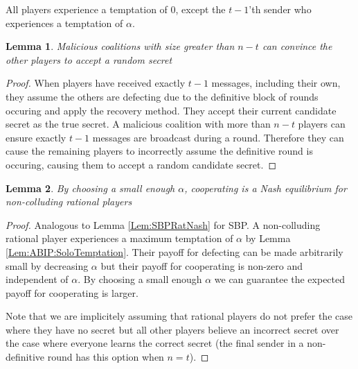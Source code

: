 \documentclass{dalcsthesis}
\newtheorem{lemma}{Lemma}
\begin{document}
All players experience a temptation of $0$, except the $t-1$'th sender who experiences a temptation of $\alpha$.

\begin{lemma} Malicious coalitions with size greater than $n-t$ can convince the other players to accept a random secret \label{Lem:ABIP:LargeMalTricks} \end{lemma}
\begin{proof}
When players have received exactly $t-1$ messages, including their own, they assume the others are defecting due to the definitive block of rounds occuring and apply the recovery method. They accept their current candidate secret as the true secret. A malicious coalition with more than $n-t$ players can ensure exactly $t-1$ messages are broadcast during a round. Therefore they can cause the remaining players to incorrectly assume the definitive round is occuring, causing them to accept a random candidate secret.
\end{proof}

\begin{lemma} By choosing a small enough $\alpha$, cooperating is a Nash equilibrium for non-colluding rational players \label{Lem:ABIP:SoloNash} \end{lemma}
\begin{proof}
Analogous to Lemma \ref{Lem:SBPRatNash} for SBP. A non-colluding rational player experiences a maximum temptation of $\alpha$ by Lemma \ref{Lem:ABIP:SoloTemptation}. Their payoff for defecting can be made arbitrarily small by decreasing $\alpha$ but their payoff for cooperating is non-zero and independent of $\alpha$. By choosing a small enough $\alpha$ we can guarantee the expected payoff for cooperating is larger.

Note that we are implicitely assuming that rational players do not prefer the case where they have no secret but all other players believe an incorrect secret over the case where everyone learns the correct secret (the final sender in a non-definitive round has this option when $n=t$).
\end{proof}
\end{document}
